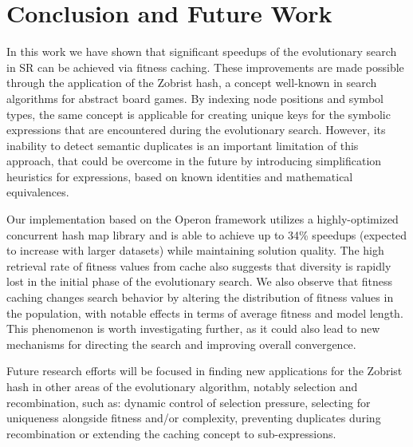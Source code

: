 \documentclass[openacc]{rstransa}%
\begin{document}
\section{Conclusion and Future Work}\label{sec:conclusion}

In this work we have shown that significant speedups of the evolutionary search in SR can be achieved via fitness caching. These improvements are made possible through the application of the Zobrist hash, a concept well-known in search algorithms for abstract board games. By indexing node positions and symbol types, the same concept is applicable for creating unique keys for the symbolic expressions that are encountered during the evolutionary search. However, its inability to detect semantic duplicates is an important limitation of this approach, that could be overcome in the future by introducing simplification heuristics for expressions, based on known identities and mathematical equivalences.

Our implementation based on the Operon framework utilizes a highly-optimized concurrent hash map library and is able to achieve up to 34\% speedups (expected to increase with larger datasets) while maintaining solution quality. The high retrieval rate of fitness values from cache also suggests that diversity is rapidly lost in the initial phase of the evolutionary search. We also observe that fitness caching changes search behavior by altering the distribution of fitness values in the population, with notable effects in terms of average fitness and model length. This phenomenon is worth investigating further, as it could also lead to new mechanisms for directing the search and improving overall convergence.

Future research efforts will be focused in finding new applications for the Zobrist hash in other areas of the evolutionary algorithm, notably selection and recombination, such as: dynamic control of selection pressure, selecting for uniqueness alongside fitness and/or complexity, preventing duplicates during recombination or extending the caching concept to sub-expressions.



\end{document}
